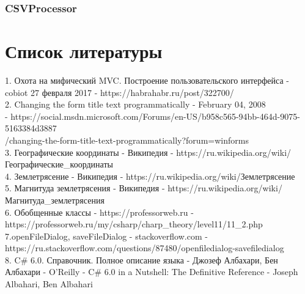 \documentclass[a4paper,12pt, fleqn]{article}
\theoremstyle{plain} %
\theoremstyle{definition} %
\theoremstyle{remark} %
\numberwithin{equation}{section}
\begin{document}
\subsubsection{CSVProcessor}


\newpage
\section{Список литературы}

1. Охота на мифический MVC. Построение пользовательского интерфейса - cobiot
27 февраля 2017 - https://habrahabr.ru/post/322700/\\
2. Changing the form title text programmatically - February 04, 2008\\ - https://social.msdn.microsoft.com/Forums/en-US/b958c565-94bb-464d-9075-5163384d3887\\/changing-the-form-title-text-programmatically?forum=winforms\\
3. Географические координаты - Википедия - https://ru.wikipedia.org/wiki/\\Географические\_координаты\\
4. Землетрясение - Википедия - https://ru.wikipedia.org/wiki/Землетрясение\\
5. Магнитуда землетрясения - Википедия - https://ru.wikipedia.org/wiki/\\Магнитуда\_землетрясения\\
6. Обобщенные классы - https://professorweb.ru -\\ https://professorweb.ru/my/csharp/charp\_theory/level11/11\_2.php\\
7.openFileDialog, saveFileDialog - stackoverflow.com - \\ https://ru.stackoverflow.com/questions/87480/openfiledialog-savefiledialog\\
8. C# 6.0. Справочник. Полное описание языка - Джозеф Албахари, Бен Албахари - O’Reilly - C# 6.0 in a Nutshell: The Definitive Reference - Joseph Albahari, Ben Albahari
\end{document}
